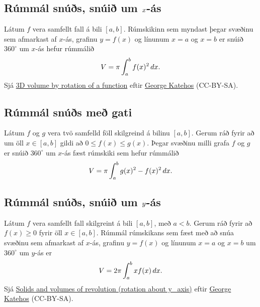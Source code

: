 \documentclass[b5paper,10pt,icelandic]{sphinxmanual}
\begin{document}

\subsection{Rúmmál snúðs, snúið um \protect\(x\protect\)-ás}
\label{kafli07:rummal-snus-snui-um-as}\label{kafli07:index-3}
Látum \(f\) vera samfellt fall á bili \([a, b]\). Rúmskikinn sem
myndast þegar svæðinu sem afmarkast af \(x\)-ás, grafinu
\(y=f(x)\) og línunum \(x=a\) og \(x=b\) er snúið
\(360^\circ\) um \(x\)-ás hefur rúmmálið
\begin{gather}
\begin{split}V=\pi\int_a^b f(x)^2\,dx.\end{split}\notag
\end{gather}
Sjá  \href{https://www.geogebra.org/m/40798}{3D volume by rotation of a function}
eftir \href{https://www.geogebra.org/material/show/id/40798}{George Katehos} (CC-BY-SA).


\subsection{Rúmmál snúðs með gati}
\label{kafli07:index-4}\label{kafli07:rummal-snus-me-gati}
Látum \(f\) og \(g\) vera tvö samfelld föll skilgreind á bilinu
\([a, b]\). Gerum ráð fyrir að um öll \(x\in [a, b]\) gildi að
\(0\leq f(x)\leq
g(x)\). Þegar svæðinu milli grafa \(f\) og \(g\) er snúið
\(360^\circ\) um \(x\)-ás fæst rúmskiki sem hefur rúmmálið
\begin{gather}
\begin{split}V=\pi\int_a^b g(x)^2-f(x)^2\,dx.\end{split}\notag
\end{gather}

\subsection{Rúmmál snúðs, snúið um \protect\(y\protect\)-ás}
\label{kafli07:id1}\label{kafli07:index-5}
Látum \(f\) vera samfellt fall skilgreint á bili \([a, b]\), með
\(a<b\). Gerum ráð fyrir að \(f(x)\geq 0\) fyrir öll
\(x\in [a, b]\). Rúmmál rúmskikans sem fæst með að snúa svæðinu sem
afmarkast af \(x\)-ás, grafinu \(y=f(x)\) og línunum \(x=a\)
og \(x=b\) um \(360^\circ\) um \(y\)-ás er
\begin{gather}
\begin{split}V=2\pi\int_a^b xf(x)\,dx.\end{split}\notag
\end{gather}
Sjá \href{https://www.geogebra.org/b/75281\#material/18475}{Solids and volumes of revolution (rotation about y\_axis)}
eftir \href{https://www.geogebra.org/b/75281\#material/18475}{George Katehos} (CC-BY-SA).
\end{document}
